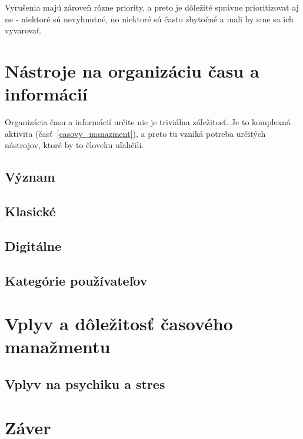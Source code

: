 \documentclass[10pt,slovak,a4paper]{article}
\begin{document}
		Vyrušenia majú zároveň rôzne priority\cite{NoTask}, a preto je dôležité správne prioritizovať aj ne - niektoré sú nevyhnutné, no niektoré sú často zbytočné a mali by sme sa ich vyvarovať.

\section{Nástroje na organizáciu času a informácií}
		Organizácia času a informácií určite nie je triviálna záležitosť. Je to komplexná aktivita (časť~\ref{casovy_manazment}), a preto tu vzniká potreba určitých nástrojov, ktoré by to človeku uľahčili.
		
		
	\subsection{Význam}
	\subsection{Klasické}
	\subsection{Digitálne}
	\subsection{Kategórie používateľov}

\section{Vplyv a dôležitosť časového manažmentu}
% 
	\subsection{Vplyv na psychiku a stres}
\section{Záver}



\end{document}
